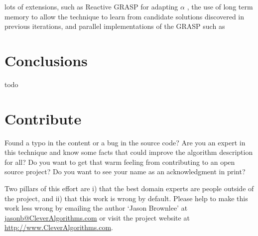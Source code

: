 \documentclass[a4paper, 11pt]{article}
\makeatletter
\newcommand{\myreportauthor}{Jason Brownlee}
\newcommand{\myreportemail}{jasonb@CleverAlgorithms.com}
\newcommand{\myreportwebsite}{http://www.CleverAlgorithms.com}
\makeatother
\begin{document}
lots of extensions, such as Reactive GRASP for adapting $\alpha$ \cite{Prais2000}, the use of long term memory to allow the technique to learn from candidate solutions discovered in previous iterations, and parallel implementations of the GRASP such as \cite{Pardalos1995} 



% 
% 
\section{Conclusions}
\label{sec:conclusions}
todo

% 
% 
\section{Contribute}
\label{sec:contribute}
Found a typo in the content or a bug in the source code? 
Are you an expert in this technique and know some facts that could improve the algorithm description for all?
Do you want to get that warm feeling from contributing to an open source project? 
Do you want to see your name as an acknowledgment in print?

Two pillars of this effort are i) that the best domain experts are people outside of the project, and ii) that this work is wrong by default. 
Please help to make this work less wrong by emailing the author `\myreportauthor' at \url{\myreportemail} or visit the project website at \url{\myreportwebsite}.



\end{document}
